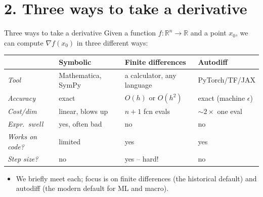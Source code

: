 \documentclass[aspectratio=169,11pt]{beamer}
\newcommand{\emphc}[1]{\textcolor{harvardcrimson}{#1}}
\newcommand{\R}{\mathbb{R}}
\begin{document}
\section*{2. Three ways to take a derivative}

\begin{frame}{Three ways to take a derivative}
\footnotesize
Given a function $f:\R^n \to \R$ and a point $x_0$, we can compute $\nabla f(x_0)$ in three different ways:
\vspace{3pt}
\begin{center}
\renewcommand{\arraystretch}{1.2}
\begin{tabular}{p{2.4cm} p{3.4cm} p{3.8cm} p{2.8cm}}
\toprule
& \textbf{Symbolic} & \textbf{Finite differences} & \textbf{Autodiff} \\
\midrule
\emph{Tool} & Mathematica, SymPy & a calculator, any language & PyTorch/TF/JAX \\
\emph{Accuracy} & exact & $O(h)$ or $O(h^2)$ & exact (machine $\epsilon$) \\
\emph{Cost/dim} & linear, blows up & \emphc{$n+1$ fcn evals} & \emphc{$\sim 2\times$ one eval} \\
\emph{Expr.\ swell} & yes, often bad & no & no \\
\emph{Works on code?} & limited & yes & yes \\
\emph{Step size?} & no & \emphc{yes -- hard!} & no \\
\bottomrule
\end{tabular}
\end{center}
\vspace{4pt}
\begin{itemize}\itemsep2pt
\item We briefly meet each; focus is on \emphc{finite differences} (the historical default) and \emphc{autodiff} (the modern default for ML and macro).
\end{itemize}
\end{frame}
\end{document}
